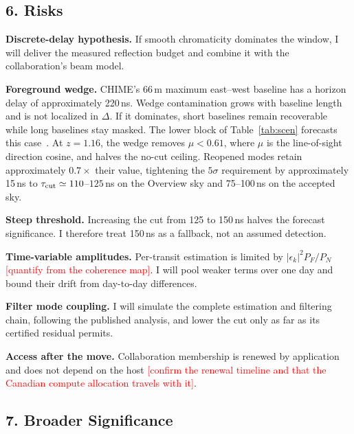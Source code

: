 \documentclass[12pt]{article}
\newcommand{\todo}[1]{\textcolor{red}{[#1]}}
\begin{document}
\subsection*{6. Risks}

\textbf{Discrete-delay hypothesis.} If smooth chromaticity dominates the window, I will deliver the measured reflection budget and combine it with the collaboration's beam model.

\textbf{Foreground wedge.} CHIME's 66\,m maximum east--west baseline has a horizon delay of approximately 220\,ns. Wedge contamination grows with baseline length and is not localized in $\Delta$. If it dominates, short baselines remain recoverable while long baselines stay masked. The lower block of Table~\ref{tab:scen} forecasts this case~\cite{seohirata2016}. At $z=1.16$, the wedge removes $\mu<0.61$, where $\mu$ is the line-of-sight direction cosine, and halves the no-cut ceiling. Reopened modes retain approximately $0.7\times$ their value, tightening the $5\sigma$ requirement by approximately 15\,ns to $\tau_{\rm cut}\simeq110$--$125$\,ns on the Overview sky and 75--100\,ns on the accepted sky.

\textbf{Steep threshold.} Increasing the cut from 125 to 150\,ns halves the forecast significance. I therefore treat 150\,ns as a fallback, not an assumed detection.

\textbf{Time-variable amplitudes.} Per-transit estimation is limited by $|\epsilon_k|^2P_F/P_N$ \todo{quantify from the coherence map}. I will pool weaker terms over one day and bound their drift from day-to-day differences.

\textbf{Filter mode coupling.} I will simulate the complete estimation and filtering chain, following the published analysis, and lower the cut only as far as its certified residual permits.

\textbf{Access after the move.} Collaboration membership is renewed by application and does not depend on the host \todo{confirm the renewal timeline and that the Canadian compute allocation travels with it}.

\subsection*{7. Broader Significance}
\end{document}
